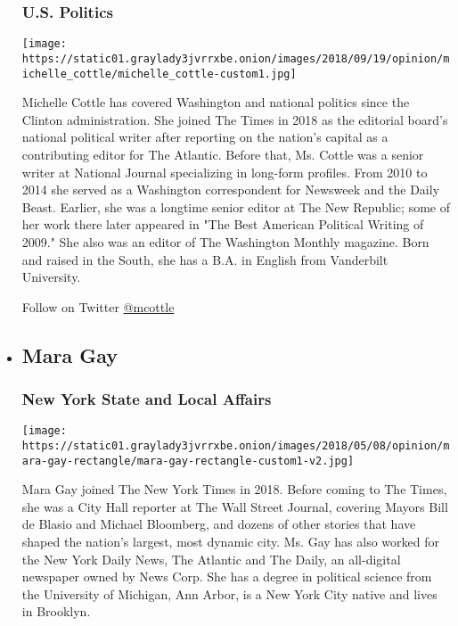 \begin{itemize}
  \hypertarget{us-politics}{%
  \subsubsection{U.S. Politics}\label{us-politics}}

  \texttt{[image: https://static01.graylady3jvrrxbe.onion/images/2018/09/19/opinion/michelle\_cottle/michelle\_cottle-custom1.jpg]}

  Michelle Cottle has covered Washington and national politics since the
  Clinton administration. She joined The Times in 2018 as the editorial
  board's national political writer after reporting on the nation's
  capital as a contributing editor for The Atlantic. Before that, Ms.
  Cottle was a senior writer at National Journal specializing in
  long-form profiles. From 2010 to 2014 she served as a Washington
  correspondent for Newsweek and the Daily Beast. Earlier, she was a
  longtime senior editor at The New Republic; some of her work there
  later appeared in "The Best American Political Writing of 2009." She
  also was an editor of The Washington Monthly magazine. Born and raised
  in the South, she has a B.A. in English from Vanderbilt University.

  Follow on Twitter \href{http://twitter.com/mcottle}{@mcottle}
\item
  \hypertarget{mara-gay}{%
  \subsection{Mara Gay}\label{mara-gay}}

  \hypertarget{new-york-state-and-local-affairs}{%
  \subsubsection{New York State and Local
  Affairs}\label{new-york-state-and-local-affairs}}

  \texttt{[image: https://static01.graylady3jvrrxbe.onion/images/2018/05/08/opinion/mara-gay-rectangle/mara-gay-rectangle-custom1-v2.jpg]}

  Mara Gay joined The New York Times in 2018. Before coming to The
  Times, she was a City Hall reporter at The Wall Street Journal,
  covering Mayors Bill de Blasio and Michael Bloomberg, and dozens of
  other stories that have shaped the nation's largest, most dynamic
  city. Ms. Gay has also worked for the New York Daily News, The
  Atlantic and The Daily, an all-digital newspaper owned by News Corp.
  She has a degree in political science from the University of Michigan,
  Ann Arbor, is a New York City native and lives in Brooklyn.


\end{itemize}
